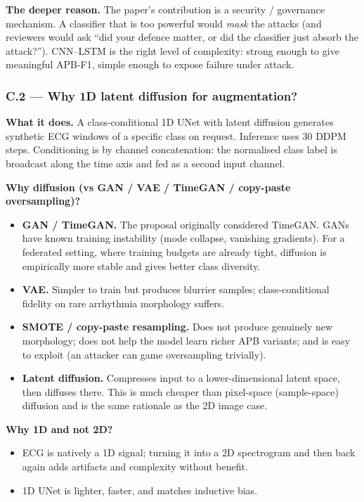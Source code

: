 \documentclass[11pt,a4paper]{article}
\begin{document}
\textbf{The deeper reason.} The paper's contribution is a security /
governance mechanism. A classifier that is too powerful would \emph{mask}
the attacks (and reviewers would ask ``did your defence matter, or did
the classifier just absorb the attack?''). CNN--LSTM is the right level of
complexity: strong enough to give meaningful APB-F1, simple enough to
expose failure under attack.

\subsubsection{C.2 --- Why 1D latent diffusion for augmentation?}

\textbf{What it does.} A class-conditional 1D UNet with latent diffusion
generates synthetic ECG windows of a specific class on request.
Inference uses 30 DDPM steps. Conditioning is by channel concatenation:
the normalised class label is broadcast along the time axis and fed as
a second input channel.

\textbf{Why diffusion (vs GAN / VAE / TimeGAN / copy-paste oversampling)?}
\begin{itemize}
\item \textbf{GAN / TimeGAN.} The proposal originally considered TimeGAN. GANs have known training instability (mode collapse, vanishing gradients). For a federated setting, where training budgets are already tight, diffusion is empirically more stable and gives better class diversity.
\item \textbf{VAE.} Simpler to train but produces blurrier samples; class-conditional fidelity on rare arrhythmia morphology suffers.
\item \textbf{SMOTE / copy-paste resampling.} Does not produce genuinely new morphology; does not help the model learn richer APB variants; and is easy to exploit (an attacker can game oversampling trivially).
\item \textbf{Latent diffusion.} Compresses input to a lower-dimensional latent space, then diffuses there. This is much cheaper than pixel-space (sample-space) diffusion and is the same rationale as the 2D image case.
\end{itemize}

\textbf{Why 1D and not 2D?}
\begin{itemize}
\item ECG is natively a 1D signal; turning it into a 2D spectrogram and then back again adds artifacts and complexity without benefit.
\item 1D UNet is lighter, faster, and matches inductive bias.
\end{itemize}
\end{document}
